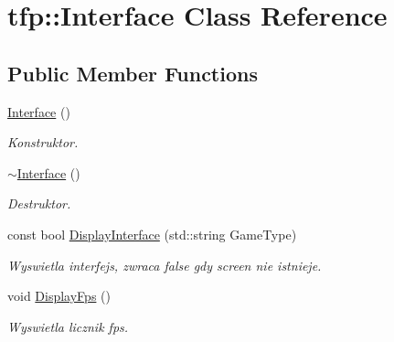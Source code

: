 \hypertarget{classtfp_1_1_interface}{}\section{tfp\+:\+:Interface Class Reference}
\label{classtfp_1_1_interface}
\subsection*{Public Member Functions}
\begin{DoxyCompactItemize}
\item 
\mbox{\label{classtfp_1_1_interface_ac3b09280b7ee907daf74d34456c856b0}} 
\mbox{\hyperlink{classtfp_1_1_interface_ac3b09280b7ee907daf74d34456c856b0}{Interface}} ()
\begin{DoxyCompactList}\small\item\em Konstruktor. \end{DoxyCompactList}\item 
\mbox{\label{classtfp_1_1_interface_a4e07ff0873c6f830f5352579429330d8}} 
\mbox{\hyperlink{classtfp_1_1_interface_a4e07ff0873c6f830f5352579429330d8}{$\sim$\+Interface}} ()
\begin{DoxyCompactList}\small\item\em Destruktor. \end{DoxyCompactList}\item 
const bool \mbox{\hyperlink{classtfp_1_1_interface_ac6a62168a84c0a58f90f457b981cb6b9}{Display\+Interface}} (std\+::string Game\+Type)
\begin{DoxyCompactList}\small\item\em Wyswietla interfejs, zwraca false gdy screen nie istnieje. \end{DoxyCompactList}\item 
\mbox{\label{classtfp_1_1_interface_a48c7523ab99f00cf4a386f7e53cc1a9a}} 
void \mbox{\hyperlink{classtfp_1_1_interface_a48c7523ab99f00cf4a386f7e53cc1a9a}{Display\+Fps}} ()
\begin{DoxyCompactList}\small\item\em Wyswietla licznik fps. \end{DoxyCompactList}\item 
\mbox{\label{classtfp_1_1_interface_a9b7921e5ac2e273ad9d74d7978e67cdd}} 

\end{DoxyCompactItemize}
